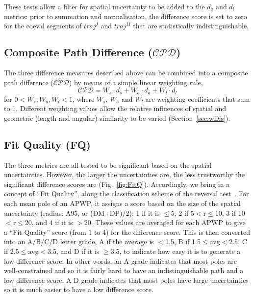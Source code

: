 These tests allow a filter for spatial uncertainty to be added to the $d_a$ and
$d_l$ metrics: prior to summation and normalisation, the difference score is set
to zero for the coeval segments of $traj^I$ and $traj^{II}$ that are
statistically indistinguishable.

\subsection{Composite Path Difference ($\mathcal{CPD}$)}

The three difference measures described above can be combined into a composite
path difference ($\mathcal{CPD}$) by means of a simple linear weighting rule,
%
\begin{equation*}
\mathcal{CPD} = W_s \cdot d_s + W_a \cdot d_a + W_l \cdot d_l
\label{eq:cpd}
\end{equation*}
%
for $0 < W_s,W_a,W_l < 1$, where $W_s$, $W_a$ and $W_l$ are weighting
coefficients that sum to 1. Different weighting values allow the relative
influences of spatial and geometric (length and angular) similarity to be
varied (Section~\ref{sec:wDis}).

\subsection{Fit Quality (FQ)}\label{sec:FQ}

The three metrics are all tested to be significant based on the spatial
uncertainties. However, the larger the uncertainties are, the less trustworthy
the significant difference scores are (Fig.~\ref{fig:FitQ}). Accordingly, we
bring in a concept of ``Fit Quality'', along the classification scheme of the
reversal test~\citep{M90}. For each mean pole of an APWP, it assigns a score
based on the size of the spatial uncertainty (radius: A95, or (DM+DP)/2): 1 if
it is $\leq$5\degree, 2 if 5\degree$<$r$\leq$10\degree, 3 if
10\degree$<$r$\leq$20\degree, and 4 if it is $>$20\degree. These values are
averaged for each APWP to give a ``Fit Quality'' score (from 1 to 4) for the
difference score. This is then converted into an A/B/C/D letter grade, A if the
average is $<$1.5, B if 1.5$\leq$avg$<$2.5, C if 2.5$\leq$avg$<$3.5, and D if it
is $\geq$3.5, to indicate how easy it is to generate a low difference score. In
other words, an A grade indicates that most poles are well-constrained and so it
is fairly hard to have an indistinguishable path and a low difference score. A D
grade indicates that most poles have large uncertainties so it is much easier to
have a low difference score.

